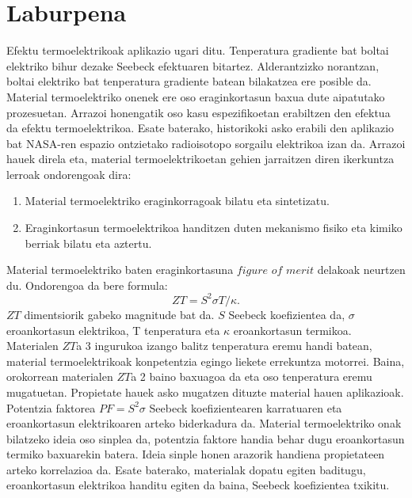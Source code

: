 
\chapter*{Laburpena} %

Efektu termoelektrikoak aplikazio ugari ditu. Tenperatura gradiente bat boltai elektriko bihur dezake Seebeck 
efektuaren bitartez. Alderantzizko norantzan, boltai elektriko bat tenperatura gradiente batean bilakatzea ere 
posible da. Material termoelektriko onenek ere oso eraginkortasun baxua dute aipatutako prozesuetan. Arrazoi 
honengatik oso kasu espezifikoetan erabiltzen den efektua da efektu termoelektrikoa. Esate baterako, historikoki 
asko erabili den aplikazio bat NASA-ren espazio ontzietako radioisotopo sorgailu 
elektrikoa\cite{yang2006thermoelectric} izan da. Arrazoi hauek direla eta, material termoelektrikoetan gehien 
jarraitzen diren ikerkuntza lerroak ondorengoak dira:
\begin{enumerate}
\item Material termoelektriko eraginkorragoak bilatu eta sintetizatu.
\item Eraginkortasun termoelektrikoa handitzen duten mekanismo fisiko eta kimiko berriak bilatu eta aztertu. 
\end{enumerate}
Material termoelektriko baten eraginkortasuna $figure$ $of$ $merit$ delakoak neurtzen du. Ondorengoa da bere formula:
\begin{equation}
\nonumber
ZT=S^{2}\sigma T/\kappa.
\end{equation}
$ZT$ dimentsiorik gabeko magnitude bat da. $S$ Seebeck koefizientea da, $\sigma$ eroankortasun elektrikoa, T 
tenperatura eta $\kappa$ eroankortasun termikoa. Materialen $ZT$a 3 ingurukoa izango balitz tenperatura eremu handi 
batean, material termoelektrikoak konpetentzia egingo liekete errekuntza motorrei\cite{zhang2015thermoelectric}. 
Baina, orokorrean materialen $ZT$a 2 baino baxuagoa da eta oso tenperatura eremu mugatuetan. Propietate hauek asko 
mugatzen dituzte material hauen aplikazioak. \\

Potentzia faktorea $PF=S^{2}\sigma$ Seebeck koefizientearen karratuaren eta eroankortasun elektrikoaren arteko
biderkadura da. Material termoelektriko onak bilatzeko ideia oso sinplea da, potentzia faktore handia behar dugu 
eroankortasun termiko baxuarekin batera. Ideia sinple honen arazorik handiena propietateen arteko korrelazioa da. 
Esate baterako, materialak dopatu egiten baditugu, eroankortasun elektrikoa handitu egiten da baina, Seebeck 
koefizientea txikitu. \\

